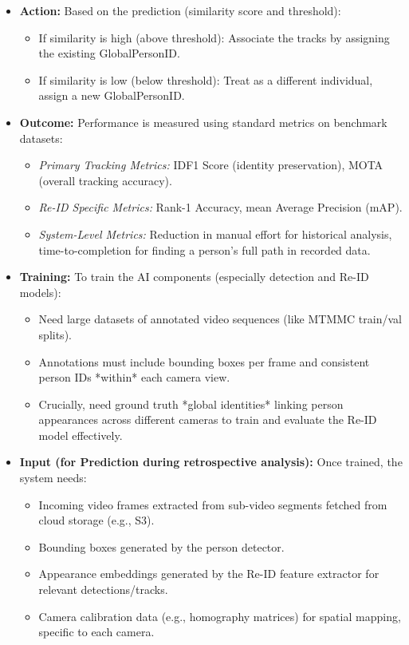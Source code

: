 \begin{itemize}
    \item \textbf{Action:} Based on the prediction (similarity score and threshold):
        \begin{itemize}
            \item If similarity is high (above threshold): Associate the tracks by assigning the existing GlobalPersonID.
            \item If similarity is low (below threshold): Treat as a different individual, assign a new GlobalPersonID.
        \end{itemize}

    \item \textbf{Outcome:} Performance is measured using standard metrics on benchmark datasets:
        \begin{itemize}
            \item \textit{Primary Tracking Metrics:} IDF1 Score (identity preservation), MOTA (overall tracking accuracy).
            \item \textit{Re-ID Specific Metrics:} Rank-1 Accuracy, mean Average Precision (mAP).
            \item \textit{System-Level Metrics:} Reduction in manual effort for historical analysis, time-to-completion for finding a person's full path in recorded data.
        \end{itemize}

    \item \textbf{Training:} To train the AI components (especially detection and Re-ID models):
        \begin{itemize}
            \item Need large datasets of annotated video sequences (like MTMMC train/val splits).
            \item Annotations must include bounding boxes per frame and consistent person IDs *within* each camera view.
            \item Crucially, need ground truth *global identities* linking person appearances across different cameras to train and evaluate the Re-ID model effectively.
        \end{itemize}

    \item \textbf{Input (for Prediction during retrospective analysis):} Once trained, the system needs:
        \begin{itemize}
            \item Incoming video frames extracted from sub-video segments fetched from cloud storage (e.g., S3).
            \item Bounding boxes generated by the person detector.
            \item Appearance embeddings generated by the Re-ID feature extractor for relevant detections/tracks.
            \item Camera calibration data (e.g., homography matrices) for spatial mapping, specific to each camera.
        \end{itemize}


\end{itemize}
